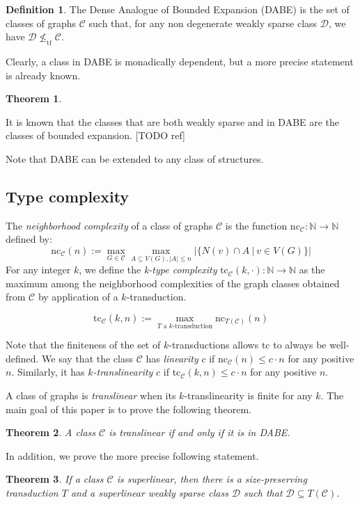 \documentclass[11pt]{article}
\newtheorem{theorem}{Theorem}
\theoremstyle{definition}
\newtheorem{definition}{Definition}
\newcommand{\CC}{{\mathscr C}}
\newcommand{\DD}{{\mathscr D}}
\newcommand{\N}{\mathbb{N}}
\newcommand{\nc}{\text{nc}}
\newcommand{\tc}{\text{tc}}
\renewcommand{\le}{\leqslant}
\newcommand{\remph}[1]{{\color{red} \emph{#1}}}
\newcommand{\tf}{\leqslant_{\text{tf}}}
\begin{document}
\begin{definition}
The Dense Analogue of Bounded Expansion (DABE) is the set of classes of graphs $\CC$ such that, for any non degenerate weakly sparse class $\DD$, we have $\DD \not \tf \CC$.
\end{definition}

Clearly, a class in DABE is monadically dependent, but a more precise statement is already known.
\begin{theorem}

\end{theorem}
It is known that the classes that are both weakly sparse and in DABE are the classes of bounded expansion. [TODO ref]

Note that DABE can be extended to any class of structures.

\subsection{Type complexity}
The \remph{neighborhood complexity} of a class of graphs $\CC$ is the function $\nc_{\CC} : \N \to \N$ defined by:
\[
\nc_{\CC}(n) := \max_{G \in \CC} \max_{A \subseteq V(G), |A| \le n} |\{ N(v) \cap A~|~v \in V(G)\}|
\]
For any integer $k$, we define the \remph{k-type complexity }$\tc_{\CC}(k, \cdot) : \N \to \N$ as the maximum among the neighborhood complexities of the graph classes obtained from $\CC$ by application of a $k$-transduction.

\[
\tc_{\CC}(k, n) := \max_{T \text{ a $k$-transduction}} \nc_{T(\CC)}(n)
\]

Note that the finiteness of the set of $k$-transductions allows $\tc$ to always be well-defined.
We say that the class $\CC$ has \remph{linearity} $c$ if $\nc_{\CC}(n) \le c \cdot n$ for any positive $n$. Similarly, it has \remph{$k$-translinearity} $c$ if $\tc_{\CC}(k, n) \le c \cdot n$ for any positive $n$.

A class of graphs is \remph{translinear} when its $k$-translinearity is finite for any $k$.
The main goal of this paper is to prove the following theorem.

\begin{theorem}\label{thm:main}
  A class $\CC$ is translinear if and only if it is in DABE.
\end{theorem}

In addition, we prove the more precise following statement.

\begin{theorem}\label{thm:main}
  If a class $\CC$ is superlinear, then there is a size-preserving transduction $T$ and a superlinear weakly sparse class $\DD$ such that $\DD \subseteq T(\CC)$.
\end{theorem}
\end{document}
